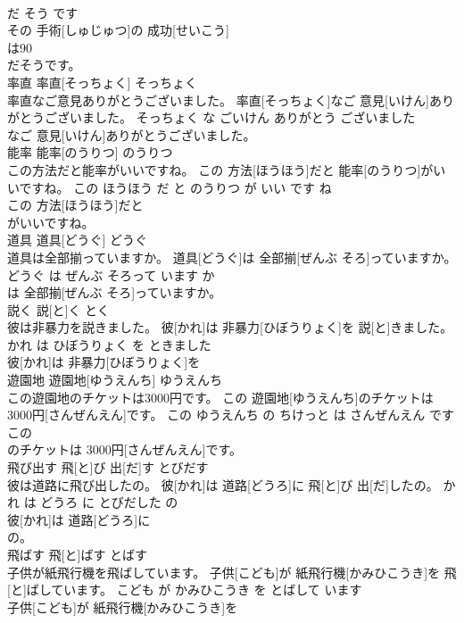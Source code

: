 \documentclass[8pt]{extreport}
\begin{document}
\begin{CJK}{UTF8}{min}
\\	だ そう です	
\\	その 手術[しゅじゅつ]の 成功[せいこう]
\\	は90
\\	だそうです。			
\\	率直	率直[そっちょく]	そっちょく	
\\	率直なご意見ありがとうございました。	率直[そっちょく]なご 意見[いけん]ありがとうございました。	そっちょく な ごいけん ありがとう ございました	
\\	なご 意見[いけん]ありがとうございました。			
\\	能率	能率[のうりつ]	のうりつ	
\\	この方法だと能率がいいですね。	この 方法[ほうほう]だと 能率[のうりつ]がいいですね。	この ほうほう だ と のうりつ が いい です ね	
\\	この 方法[ほうほう]だと
\\	がいいですね。			
\\	道具	道具[どうぐ]	どうぐ	
\\	道具は全部揃っていますか。	道具[どうぐ]は 全部揃[ぜんぶ そろ]っていますか。	どうぐ は ぜんぶ そろって います か	
\\	は 全部揃[ぜんぶ そろ]っていますか。			
\\	説く	説[と]く	とく	
\\	彼は非暴力を説きました。	彼[かれ]は 非暴力[ひぼうりょく]を 説[と]きました。	かれ は ひぼうりょく を ときました	
\\	彼[かれ]は 非暴力[ひぼうりょく]を
\\	遊園地	遊園地[ゆうえんち]	ゆうえんち	
\\	この遊園地のチケットは3000円です。	この 遊園地[ゆうえんち]のチケットは 3000円[さんぜんえん]です。	この ゆうえんち の ちけっと は さんぜんえん です	
\\	この
\\	のチケットは 3000円[さんぜんえん]です。			
\\	飛び出す	飛[と]び 出[だ]す	とびだす	
\\	彼は道路に飛び出したの。	彼[かれ]は 道路[どうろ]に 飛[と]び 出[だ]したの。	かれ は どうろ に とびだした の	
\\	彼[かれ]は 道路[どうろ]に
\\	の。			
\\	飛ばす	飛[と]ばす	とばす	
\\	子供が紙飛行機を飛ばしています。	子供[こども]が 紙飛行機[かみひこうき]を 飛[と]ばしています。	こども が かみひこうき を とばして います	
\\	子供[こども]が 紙飛行機[かみひこうき]を

\end{CJK}
\end{document}
